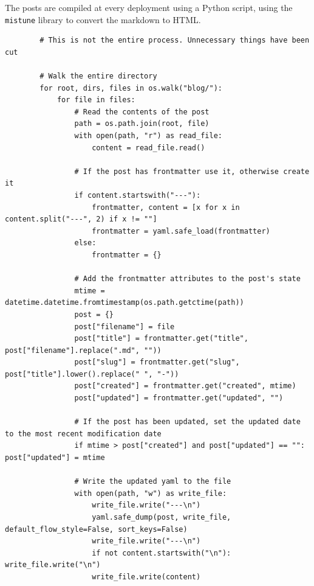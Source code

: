 \documentclass[titlepage]{article}
\begin{document}
        The posts are compiled at every deployment using a Python script, using
        the \texttt{mistune} library to convert the markdown to HTML.
        \begin{verbatim}
        # This is not the entire process. Unnecessary things have been cut

        # Walk the entire directory
        for root, dirs, files in os.walk("blog/"):
            for file in files:
                # Read the contents of the post
                path = os.path.join(root, file)
                with open(path, "r") as read_file:
                    content = read_file.read()

                # If the post has frontmatter use it, otherwise create it
                if content.startswith("---"):
                    frontmatter, content = [x for x in content.split("---", 2) if x != ""]
                    frontmatter = yaml.safe_load(frontmatter)
                else:
                    frontmatter = {}

                # Add the frontmatter attributes to the post's state
                mtime = datetime.datetime.fromtimestamp(os.path.getctime(path))
                post = {}
                post["filename"] = file
                post["title"] = frontmatter.get("title", post["filename"].replace(".md", ""))
                post["slug"] = frontmatter.get("slug", post["title"].lower().replace(" ", "-"))
                post["created"] = frontmatter.get("created", mtime)
                post["updated"] = frontmatter.get("updated", "")

                # If the post has been updated, set the updated date to the most recent modification date
                if mtime > post["created"] and post["updated"] == "": post["updated"] = mtime

                # Write the updated yaml to the file
                with open(path, "w") as write_file:
                    write_file.write("---\n")
                    yaml.safe_dump(post, write_file, default_flow_style=False, sort_keys=False)
                    write_file.write("---\n")
                    if not content.startswith("\n"): write_file.write("\n")
                    write_file.write(content)
        \end{verbatim}
\end{document}
